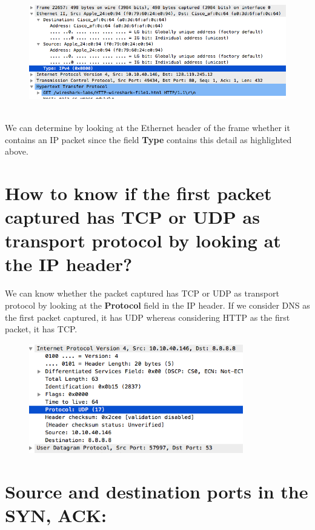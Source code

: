 \documentclass[]{report}
\begin{document}
\begin{figure}[H]
	\vspace{0pt}
	\includegraphics[height = 145pt, keepaspectratio]{Snapshots/q13.png}
\end{figure}
We can determine by looking at the Ethernet header of the frame whether it contains an IP packet since the field \textbf{Type} contains this detail as highlighted above. 

\section{How to know if the first packet captured has TCP or UDP as transport protocol by looking at the IP header?}
We can know whether the packet captured has TCP or UDP as transport protocol by looking at the \textbf{Protocol} field in the IP header. If we consider DNS as the first packet captured, it has UDP whereas considering HTTP as the first packet, it has TCP. 
\begin{figure}[H]
	\vspace{0pt}
	\includegraphics[height = 135pt, keepaspectratio]{Snapshots/q14.png}
\end{figure}

\section{Source and destination ports in the SYN, ACK:}
\end{document}
